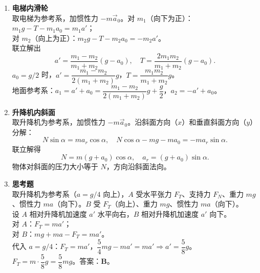 \documentclass[12pt]{article}
\begin{document}
\begin{enumerate}[label=\textbf{例\arabic*.}, leftmargin=*]
\item \textbf{电梯内滑轮}\\
取电梯为参考系，加惯性力 $-m\vec{a}_0$。对 $m_1$（向下为正）：$m_1 g - T - m_1 a_0 = m_1 a'$；\\
对 $m_2$（向上为正）：$m_2 g - T - m_2 a_0 = -m_2 a'$。\\
联立解出
\[
  a' = \frac{m_1 - m_2}{m_1 + m_2}(g - a_0),\quad
  T = \frac{2m_1 m_2}{m_1 + m_2}(g - a_0).
\]
$a_0 = g/2$ 时，$a' = \dfrac{m_1 - m_2}{2(m_1 + m_2)}g$，$T = \dfrac{m_1 m_2}{m_1 + m_2}g$。\\
地面参考系：$a_1 = a' + a_0 = \dfrac{m_1 - m_2}{2(m_1 + m_2)}g + \dfrac{g}{2}$，$a_2 = -a' + a_0$。

\item \textbf{升降机内斜面}\\
取升降机为参考系，加惯性力 $-m\vec{a}_0$。沿斜面方向（$x$）和垂直斜面方向（$y$）分解：
\[
  N\sin\alpha = m a_r\cos\alpha,\quad N\cos\alpha - mg - ma_0 = -m a_r\sin\alpha.
\]
联立解得
\[
  N = m(g + a_0)\cos\alpha,\quad a_r = (g + a_0)\sin\alpha.
\]
物体对斜面的压力大小等于 $N$，方向沿斜面法向。

\item \textbf{思考题}\\
取升降机为参考系（$a = g/4$ 向上），$A$ 受水平张力 $F_T$、支持力 $F_N$、重力 $mg$、惯性力 $ma$（向下）。$B$ 受 $F_T$（向上）、重力 $mg$、惯性力 $ma$（向下）。\\
设 $A$ 相对升降机加速度 $a'$ 水平向右，$B$ 相对升降机加速度 $a'$ 向下。\\
对 $A$：$F_T = m a'$；\\
对 $B$：$mg + ma - F_T = m a'$。\\
代入 $a = g/4$：$F_T = m a'$，$\dfrac{5}{4}mg - ma' = ma' \Rightarrow a' = \dfrac{5}{8}g$。\\
$F_T = m\cdot \dfrac{5}{8}g = \dfrac{5}{8}mg$。答案：\textbf{B}。

\end{enumerate}
\end{document}
